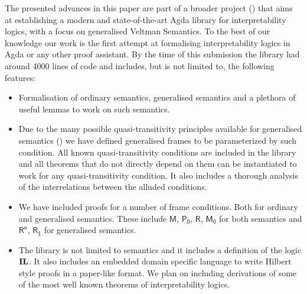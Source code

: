 \documentclass[twoside]{aiml20}
\newcommand{\il}{\ensuremath{\textup{\textbf{IL}}}\xspace}
\newcommand{\principle}[1]{\text{$\mathsf{#1}$}}
\newcommand{\jan}[1]{\textcolor{orange}{\bf Jan: #1}}
\newcommand{\luka}[1]{\textcolor{blue}{\bf Luka: #1}}
\begin{document}
The presented advances in this paper are part of a
broader project (\cite{MasRovira:2020:MastersThesis}) that aims at establishing
a modern and state-of-the-art Agda library for interpretability logics, with a
focus on generalised Veltman Semantics. To the best of our knowledge our work is the first
attempt at formalising interpretability logics in Agda or any other proof
assistant. By the time of this submission the library had around 4000 lines of code and
includes, but is not limited to, the following features:
\begin{itemize}[nosep]
\item Formalisation of ordinary semantics, generalised semantics
  and a plethora of useful lemmas to work on such semantics.
\item Due to the many possible quasi-transitivity principles available for generalised
  semantics (\cite{OverviewGeneralised}) we have defined generalised frames to be
  parameterized by such condition. All known quasi-transitivity conditions are
  included in the library and all theorems that do not directly depend on them can
  be instantiated to work for any quasi-transitivity condition. It also includes
  a thorough analysis of the interrelations between the alluded conditions.
\item We have included proofs for a number of frame conditions. Both for
  ordinary and generalised semantics. These include $\principle{M}$,
  $\principle{P_0}$, $\principle{R}$, $\principle{M_0}$ for both semantics and
  $\principle{R^n}$, $\principle{R_1}$ for generalised semantics.
\item The library is not limited to semantics and it includes a definition of
  the logic \il{}. 
  It also includes an embedded domain specific language to
  write Hilbert style proofs in a paper-like format. We plan on including derivations
  of some of the most well known theorems of interpretability logics.

\end{itemize}
\end{document}
